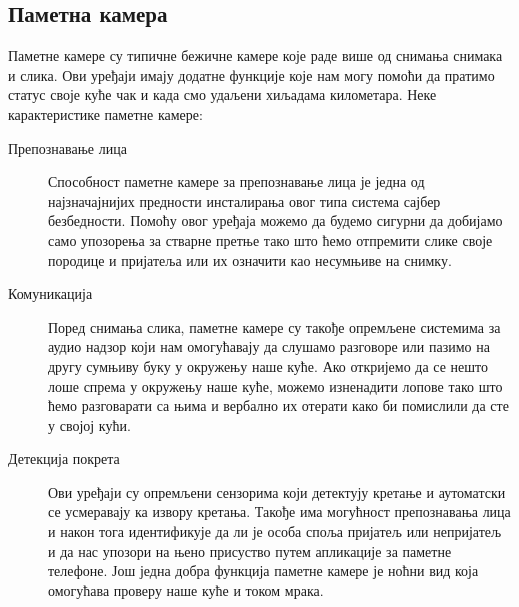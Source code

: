 \documentclass[a4paper]{article}
\begin{document}
\subsection{Паметна камера}
Паметне камере су типичне бежичне камере које раде више од снимања снимака и слика.
Ови уређаји имају додатне функције које нам могу помоћи да пратимо статус своје куће чак и када смо удаљени хиљадама километара.
\newline\newline Неке карактеристике паметне камере:
\begin{description}
    \item[Препознавање лица]
    Способност паметне камере за препознавање лица је једна од најзначајнијих предности инсталирања овог типа система сајбер безбедности.
    Помоћу овог уређаја можемо да будемо сигурни да добијамо само упозорења за стварне претње тако што ћемо отпремити слике своје породице
    и пријатеља или их означити као несумњиве на снимку.
    \item[Комуникација]
    Поред снимања слика, паметне камере су такође опремљене системима за аудио надзор који нам омогућавају да слушамо разговоре или
    пазимо на другу сумњиву буку у окружењу наше куће. Ако откријемо да се нешто лоше спрема у окружењу наше куће, можемо изненадити лопове
    тако што ћемо разговарати са њима и вербално их отерати како би помислили да сте у својој кући.
    \item[Детекција покрета]
    Ови уређаји су опремљени сензорима који детектују кретање и аутоматски се усмеравају ка извору кретања. Такође има могућност препознавања лица и
    након тога идентификује да ли је особа споља пријатељ или непријатељ и да нас упозори на њено присуство путем апликације за паметне телефоне.
    Још једна добра функција паметне камере је ноћни вид која омогућава проверу наше куће и током мрака.
\end{description}
\end{document}
